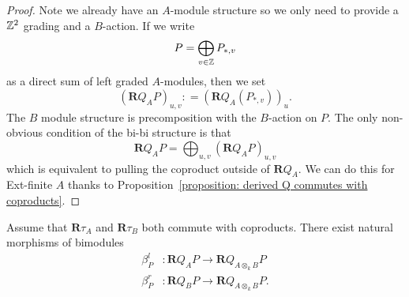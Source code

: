 \begin{proof}
  Note we already have an \(A\)-module structure so we only need to provide a \(\mathbb{Z}^2\) grading and a \(B\)-action. If we write 
  \begin{displaymath}
    P = \bigoplus_{v \in \mathbb{Z}} P_{\ast,v}
  \end{displaymath}
  as a direct sum of left graded \(A\)-modules, then we set 
  \begin{displaymath}
    (\mathbf{R}Q_A P)_{u,v} : = ( \mathbf{R} Q_A (P_{\ast,v}) )_u.
  \end{displaymath}
  The \(B\) module structure is precomposition with the \(B\)-action on \(P\). The only non-obvious condition of the bi-bi structure is that 
  \begin{displaymath}
    \mathbf{R}Q_A P = \bigoplus_{u,v} (\mathbf{R}Q_A P)_{u,v}
  \end{displaymath}
  which is equivalent to pulling the coproduct outside of \(\mathbf{R}Q_A\). We can do this for Ext-finite \(A\) thanks to Proposition~\ref{proposition: derived Q commutes with coproducts}. 
\end{proof}

\begin{corollary} \label{corollary: natural maps between Qs}
  Assume that \(\mathbf{R}\tau_A\) and \(\mathbf{R}\tau_B\) both commute with coproducts. There exist natural morphisms of bimodules 
  \begin{align*}
    \beta^l_P & : \mathbf{R}Q_{A} P \to \mathbf{R}Q_{A \otimes_k B} P \\
    \beta^r_P & : \mathbf{R}Q_{B} P \to \mathbf{R}Q_{A \otimes_k B} P.
  \end{align*}
\end{corollary}

